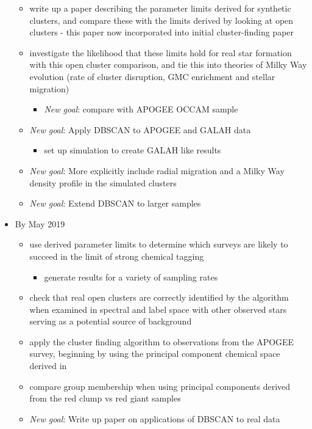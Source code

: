 \documentclass[11pt]{article}
\begin{document}
\begin{itemize}
\begin{itemize}
\item {\color{BurntOrange} write up a paper describing the parameter limits derived for synthetic clusters, and compare these with the limits derived by looking at open clusters} - this paper now incorporated into initial cluster-finding paper
\item investigate the likelihood that these limits hold for real star formation with this open cluster comparison, and tie this into theories of Milky Way evolution (rate of cluster disruption, GMC enrichment and stellar migration)
\begin{itemize}
\item \emph{New goal}: compare with APOGEE OCCAM sample
\end{itemize}
\item \emph{New goal}: Apply DBSCAN to APOGEE and GALAH data
\begin{itemize}
\item set up simulation to create GALAH like results
\end{itemize}
\item \emph{New goal}: More explicitly include radial migration and a Milky Way density profile in the simulated clusters
\item \emph{New goal}: Extend DBSCAN to larger samples
\end{itemize}
\item By May 2019
\begin{itemize}
\item use derived parameter limits to determine which surveys are likely to succeed in the limit of strong chemical tagging
	\begin{itemize}
		\item {\color{ForestGreen} generate results for a variety of sampling rates}
	\end{itemize}
\item {\color{RoyalBlue} check that real open clusters are correctly identified by the algorithm when examined in spectral and label space with other observed stars serving as a potential source of background}
\item {\color{ForestGreen} apply the cluster finding algorithm to observations from the APOGEE survey, beginning by using the principal component chemical space derived in \citet{Price-Jones2017}}
\item {\color{ForestGreen} compare group membership when using principal components derived from the red clump vs red giant samples}
\item \emph{New goal}: Write up paper on applications of DBSCAN to real data
\end{itemize} 
\end{itemize}
\end{document}
